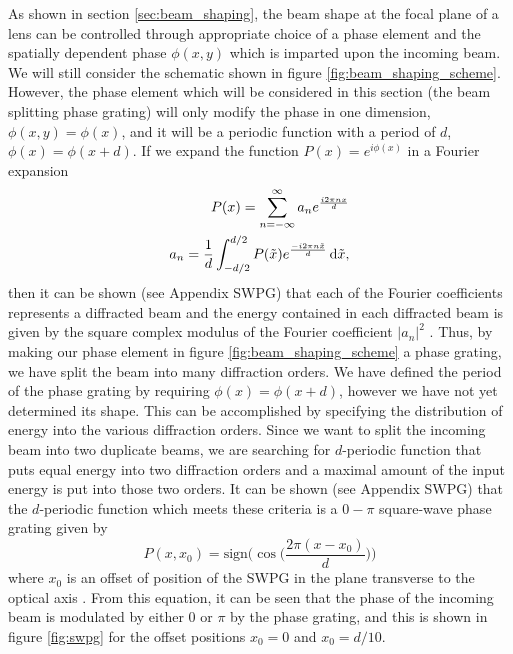 As shown in section \ref{sec:beam_shaping}, the beam shape at the focal plane of a lens can be controlled through appropriate choice of a phase element and the spatially dependent phase $\phi(x,y)$ which is imparted upon the incoming beam.  We will still consider the schematic shown in figure \ref{fig:beam_shaping_scheme}.  However, the phase element which will be considered in this section (the beam splitting phase grating) will only modify the phase in one dimension, $\phi(x,y)=\phi(x)$, and it will be a periodic function with a period of $d$, $\phi(x)=\phi(x+d)$. If we expand the function $P(x)=e^{i\phi(x)}$ in a Fourier expansion
\begin{align}
\label{eqn:Fourier_coeff_def}
	P(x) = \sum_{n=-\infty}^{\infty}a_n e^{\frac{i2\pi n x }{d}}\\
	a_n = \frac{1}{d}\int_{-d/2}^{d/2} P(\tilde{x})e^{\frac{-i2\pi n\tilde{x}}{d}}\mathop{}\!\mathrm{d}\tilde{x},
\end{align}
then it can be shown (see Appendix SWPG) that each of the Fourier coefficients represents a diffracted beam and the energy contained in each diffracted beam is given by the square complex modulus of the Fourier coefficient $\rvert a_n\rvert^2$ \cite{romeroTheoryOptimalBeam2007}.  Thus, by making our phase element in figure \ref{fig:beam_shaping_scheme} a phase grating, we have split the beam into many diffraction orders.  We have defined the period of the phase grating by requiring $\phi(x)=\phi(x+d)$, however we have not yet determined its shape.  This can be accomplished by specifying the distribution of energy into the various diffraction orders.  Since we want to split the incoming beam into two duplicate beams, we are searching for $d$-periodic function that puts equal energy into two diffraction orders and a maximal amount of the input energy is put into those two orders. It can be shown (see Appendix SWPG) that the $d$-periodic function which meets these criteria is a $0-\pi$ square-wave phase grating given by
\begin{equation}
\label{eqn:swpg}
	P(x,x_0) = \mathrm{sign}\Bigg( \cos\bigg( \frac{2\pi(x-x_0)}{d}\bigg)\Bigg)
\end{equation} 
where $x_0$ is an offset of position of the SWPG in the plane transverse to the optical axis \cite{camperHighRelativephasePrecision2019, romeroMathematicalTheoryLaser2010}. From this equation, it can be seen that the phase of the incoming beam is modulated by either $0$ or $\pi$ by the phase grating, and this is shown in figure \ref{fig:swpg} for the offset positions $x_0=0$ and $x_0=d/10$.

